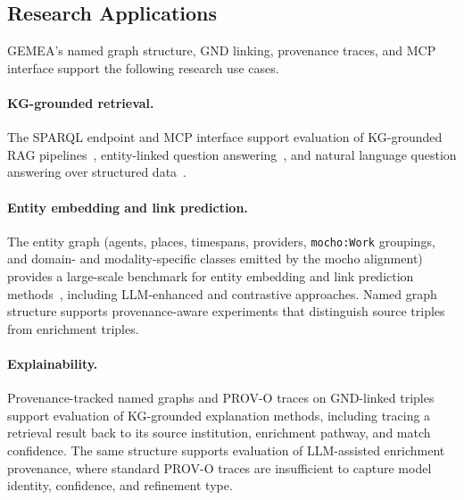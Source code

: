 \subsection{Research Applications}

GEMEA's named graph structure, GND linking, provenance traces, and MCP interface support the following research use cases.

\paragraph{KG-grounded retrieval.}
The SPARQL endpoint and MCP interface support evaluation of KG-grounded RAG pipelines~\cite{pan2024unifying}, entity-linked question answering~\cite{lan2023complex}, and natural language question answering over structured data~\cite{usbeck2018qald}.

\paragraph{Entity embedding and link prediction.}
The entity graph (agents, places, timespans, providers, \texttt{mocho:Work} groupings, and domain- and modality-specific classes emitted by the mocho alignment) provides a large-scale benchmark for entity embedding and link prediction methods~\cite{wang2017kgesurvey}, including LLM-enhanced and contrastive approaches.
Named graph structure supports provenance-aware experiments that distinguish source triples from enrichment triples.

\paragraph{Explainability.}
Provenance-tracked named graphs and PROV-O\cite{lebo2013provo} traces on GND-linked triples support evaluation of KG-grounded explanation methods, including tracing a retrieval result back to its source institution, enrichment pathway, and match confidence.
The same structure supports evaluation of LLM-assisted enrichment provenance, where standard PROV-O traces are insufficient to capture model identity, confidence, and refinement type.


